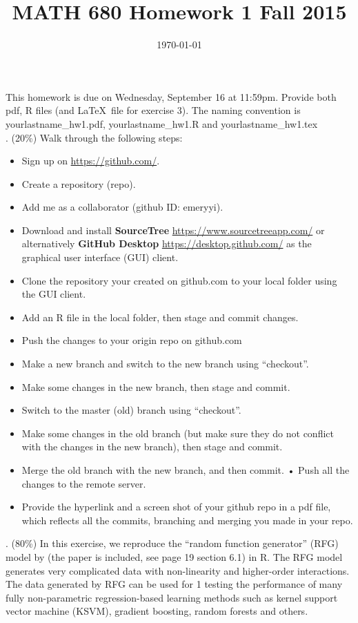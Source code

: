 \documentclass{article}
\title{MATH 680 Homework 1 Fall 2015}
\date{\today}
\begin{document}
\maketitle

This homework is due on Wednesday, September 16 at 11:59pm. Provide both pdf, R
files (and \LaTeX\ file for exercise 3). The naming convention is 
yourlastname\_hw1.pdf, yourlastname\_hw1.R and yourlastname\_hw1.tex \\


. (20\%) Walk through the following steps:
\begin{itemize}
\item Sign up on \url{https://github.com/}.
\item Create a repository (repo).
\item Add me as a collaborator (github ID: emeryyi).
\item Download and install \textbf{SourceTree} \url{https://www.sourcetreeapp.com/} or
  alternatively \textbf{GitHub Desktop} \url{https://desktop.github.com/} as the graphical user
  interface (GUI) client. 
\item Clone the repository your created on github.com to your local folder using the GUI client.
\item Add an R file in the local folder, then stage and commit changes.
\item Push the changes to your origin repo on github.com
\item Make a new branch and switch to the new branch using “checkout”.
\item Make some changes in the new branch, then stage and commit.
\item Switch to the master (old) branch using “checkout”.
\item Make some changes in the old branch (but make sure they do not conflict with the changes in the new branch), then stage and commit.
\item Merge the old branch with the new branch, and then commit.
• Push all the changes to the remote server.
\item Provide the hyperlink and a screen shot of your github repo in a pdf file, which reflects all the commits, branching and merging you made in your repo.
\end{itemize}


. (80\%) In this exercise, we reproduce the “random function generator” (RFG) model by \cite{friedman2001greedy} (the paper is included, see page 19 section 6.1) in R. The RFG model generates very complicated data with non-linearity and higher-order interactions. The data generated by RFG can be used for 
1 testing the performance of many fully non-parametric regression-based learning methods such as kernel support vector machine (KSVM), gradient boosting, random forests and others.
\end{document}

